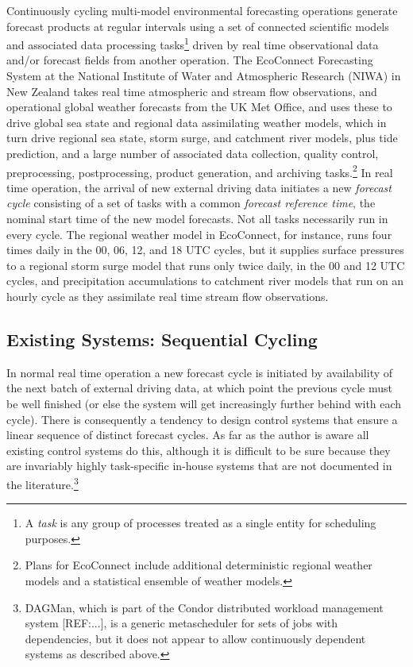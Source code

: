 \documentclass[11pt,a4paper]{article}
\begin{document}
Continuously cycling multi-model environmental forecasting operations
generate forecast products at regular intervals using a set of connected
scientific models and associated data processing tasks\footnote{A {\em
task} is any group of processes treated as a single entity for
scheduling purposes.} driven by real time observational data and/or
forecast fields from another operation. The EcoConnect Forecasting
System at the National Institute of Water and Atmospheric Research
(NIWA) in New Zealand takes real time atmospheric and stream flow
observations, and operational global weather forecasts from the UK Met
Office, and uses these to drive global sea state and regional data
assimilating weather models, which in turn drive regional sea state,
storm surge, and catchment river models, plus tide prediction, and a
large number of associated data collection, quality control,
preprocessing, postprocessing, product generation, and archiving
tasks.\footnote{Plans for EcoConnect include additional deterministic
regional weather models and a statistical ensemble of weather models.}
In real time operation, the arrival of new external driving data
initiates a new {\em forecast cycle} consisting of a set of tasks with
a common {\em forecast reference time}, the nominal start time of the
new model forecasts. Not all tasks necessarily run in every cycle. The
regional weather model in EcoConnect, for instance, runs four times
daily in the 00, 06, 12, and 18 UTC cycles, but it supplies surface
pressures to a regional storm surge model that runs only twice daily, in
the 00 and 12 UTC cycles, and precipitation accumulations to catchment
river models that run on an hourly cycle as they assimilate real time
stream flow observations. 

\subsection{Existing Systems: Sequential Cycling}

In normal real time operation a new forecast cycle is initiated by
availability of the next batch of external driving data, at which point
the previous cycle must be well finished (or else the system will get
increasingly further behind with each cycle). There is consequently a
tendency to design control systems that ensure a linear sequence of
distinct forecast cycles. As far as the author is aware all existing
control systems do this, although it is difficult to be sure because
they are invariably highly task-specific in-house systems that are
not documented in the literature.\footnote{DAGMan, which is part of the
Condor distributed workload management system [REF:...], is a generic
metascheduler for sets of jobs with dependencies, but it does not appear
to allow continuously dependent systems as described above.} 
\end{document}
